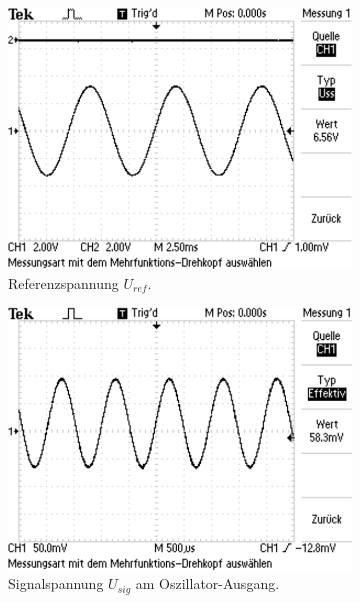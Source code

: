\begin{figure}
  \centering
  \begin{subfigure}{0.45\textwidth}
    \centering
    \includegraphics[width=\textwidth]{1.png}
    \caption{Referenzspannung $U_{ref}$.\\}
    \label{sub:1}
    \qquad
  \end{subfigure}
  \begin{subfigure}{0.45\textwidth}
    \centering
    \includegraphics[width=\textwidth]{2.png}
    \caption{Signalspannung $U_{sig}$ am Oszillator-Ausgang.}
    \label{sub:2}
    \qquad
  \end{subfigure} \\
  \begin{subfigure}{0.45\textwidth}

\end{subfigure}
\end{figure}
